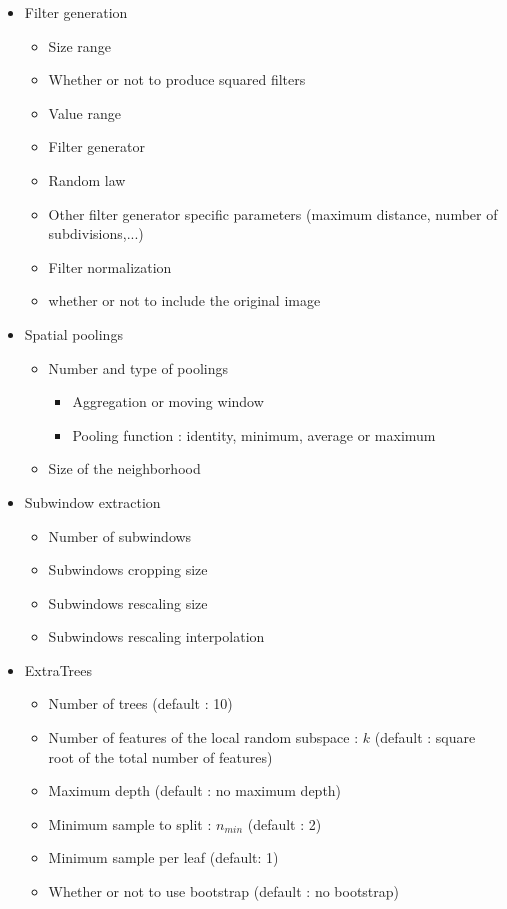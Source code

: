 \documentclass[a4paper]{report}
\begin{document}
	\begin{itemize}
	
		\item Filter generation
		\begin{itemize}
			\item Size range
			\item Whether or not to produce squared filters
			\item Value range
			\item Filter generator
			\item Random law
			\item Other filter generator specific parameters (maximum distance, number of subdivisions,...)
			\item Filter normalization
			\item whether or not to include the original image
		\end{itemize}
		
		\item Spatial poolings
		\begin{itemize}
			\item Number and type of poolings
			\begin{itemize}
				\item Aggregation or moving window
				\item Pooling function : identity, minimum, average or maximum
			\end{itemize}
			\item Size of the neighborhood
		\end{itemize}
		
		\item Subwindow extraction
		\begin{itemize}
			\item Number of subwindows
			\item Subwindows cropping size
			\item Subwindows rescaling size
			\item Subwindows rescaling interpolation
		\end{itemize}
		
		\item ExtraTrees
		\begin{itemize}
			\item Number of trees (default : 10)
			\item Number of features of the local random subspace : $k$ (default : square root of the total number of features)
			\item Maximum depth (default : no maximum depth)
			\item Minimum sample to split : $n_{min}$ (default : 2)
			\item Minimum sample per leaf (default: 1)
			\item Whether or not to use bootstrap (default : no bootstrap)
		\end{itemize}
	\end{itemize}
	
\end{document}
